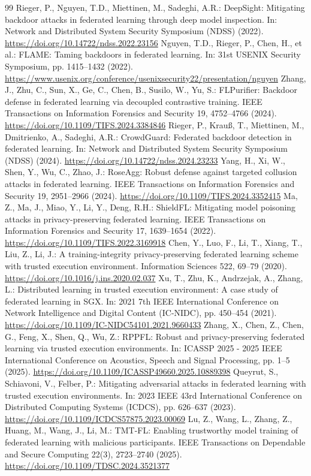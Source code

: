 \documentclass[conference,compsoc]{IEEEtran}
\begin{document}
\begin{thebibliography}{99}
     Rieger, P., Nguyen, T.D., Miettinen, M., Sadeghi, A.R.: DeepSight: Mitigating backdoor attacks in federated learning through deep model inspection. In: Network and Distributed System Security Symposium (NDSS) (2022). \url{https://doi.org/10.14722/ndss.2022.23156}
     Nguyen, T.D., Rieger, P., Chen, H., et al.: FLAME: Taming backdoors in federated learning. In: 31st USENIX Security Symposium, pp. 1415--1432 (2022). \url{https://www.usenix.org/conference/usenixsecurity22/presentation/nguyen}
     Zhang, J., Zhu, C., Sun, X., Ge, C., Chen, B., Susilo, W., Yu, S.: FLPurifier: Backdoor defense in federated learning via decoupled contrastive training. IEEE Transactions on Information Forensics and Security 19, 4752--4766 (2024). \url{https://doi.org/10.1109/TIFS.2024.3384846}
     Rieger, P., Krau{\ss}, T., Miettinen, M., Dmitrienko, A., Sadeghi, A.R.: CrowdGuard: Federated backdoor detection in federated learning. In: Network and Distributed System Security Symposium (NDSS) (2024). \url{https://doi.org/10.14722/ndss.2024.23233}
     Yang, H., Xi, W., Shen, Y., Wu, C., Zhao, J.: RoseAgg: Robust defense against targeted collusion attacks in federated learning. IEEE Transactions on Information Forensics and Security 19, 2951--2966 (2024). \url{https://doi.org/10.1109/TIFS.2024.3352415}
     Ma, Z., Ma, J., Miao, Y., Li, Y., Deng, R.H.: ShieldFL: Mitigating model poisoning attacks in privacy-preserving federated learning. IEEE Transactions on Information Forensics and Security 17, 1639--1654 (2022). \url{https://doi.org/10.1109/TIFS.2022.3169918}
     Chen, Y., Luo, F., Li, T., Xiang, T., Liu, Z., Li, J.: A training-integrity privacy-preserving federated learning scheme with trusted execution environment. Information Sciences 522, 69--79 (2020). \url{https://doi.org/10.1016/j.ins.2020.02.037}
     Xu, T., Zhu, K., Andrzejak, A., Zhang, L.: Distributed learning in trusted execution environment: A case study of federated learning in SGX. In: 2021 7th IEEE International Conference on Network Intelligence and Digital Content (IC-NIDC), pp. 450--454 (2021). \url{https://doi.org/10.1109/IC-NIDC54101.2021.9660433}
     Zhang, X., Chen, Z., Chen, G., Feng, X., Shen, Q., Wu, Z.: RPPFL: Robust and privacy-preserving federated learning via trusted execution environments. In: ICASSP 2025 - 2025 IEEE International Conference on Acoustics, Speech and Signal Processing, pp. 1--5 (2025). \url{https://doi.org/10.1109/ICASSP49660.2025.10889398}
     Queyrut, S., Schiavoni, V., Felber, P.: Mitigating adversarial attacks in federated learning with trusted execution environments. In: 2023 IEEE 43rd International Conference on Distributed Computing Systems (ICDCS), pp. 626--637 (2023). \url{https://doi.org/10.1109/ICDCS57875.2023.00069}
     Lu, Z., Wang, L., Zhang, Z., Huang, M., Wang, J., Li, M.: TMT-FL: Enabling trustworthy model training of federated learning with malicious participants. IEEE Transactions on Dependable and Secure Computing 22(3), 2723--2740 (2025). \url{https://doi.org/10.1109/TDSC.2024.3521377}


\end{thebibliography}
\end{document}
